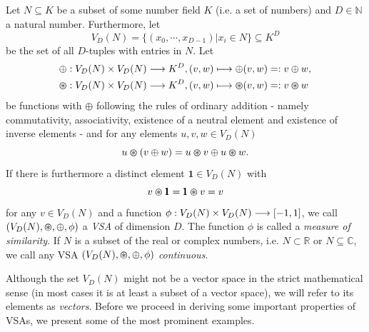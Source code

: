 \begin{defn}
	\label{def:VSA}
	Let $N \subseteq K$ be a subset of some number field $K$ (i.e. a set of numbers) and $D \in \mathbb{N}$ a natural number.
	Furthermore, let
	\[V_{D}(N)=\{\left(x_{0}, \cdots, x_{D-1}\right)  | x_{i} \in N\} \subseteq K^{D}\]
	be the set of all $D$-tuples with entries in $N$.
	Let
	\begin{align*}
		&\oplus: V_{D}(N) \times V_{D}(N) \longrightarrow K^{D}, (v,w) \longmapsto \oplus(v,w) =: v\oplus w, \\
		&\varoast: V_{D}(N) \times V_{D}(N) \longrightarrow K^{D}, (v,w) \longmapsto \varoast(v,w) =: v\varoast w
	\end{align*}
	be functions with $\oplus$ following the rules of ordinary addition - namely commutativity, associativity, existence of a neutral element and existence of inverse elements - and for any elements $u,v,w \in V_{D}(N)$
	\[u \varoast (v \oplus w) = u \varoast v \oplus u \varoast w.\]
	If there is furthermore a distinct element $\pmb{1} \in V_{D}(N)$ with
	\[v \varoast \pmb{1} = \pmb{1} \varoast v = v\]
	for any $v \in V_{D}(N)$ and a function $\phi: V_{D}(N) \times V_{D}(N) \longrightarrow \left[-1,1\right]$, we call $(V_{D}(N), \varoast, \oplus, \phi)$ a \emph{\acrfull{VSA}} of dimension $D$.
	The function $\phi$ is called a \emph{measure of similarity}.
	If $N$ is a subset of the real or complex numbers, i.e. $N \subset \mathbb{R}$ or $N \subseteq \mathbb{C}$, we call any \ac{VSA} $\left(V_{D}(N), \varoast, \oplus, \phi\right)$ \emph{continuous}.
\end{defn}
Although the set $V_{D}(N)$ might not be a vector space in the strict mathematical sense (in most cases it is at least a subset of a vector space), we will refer to its elements as \emph{vectors}.
Before we proceed in deriving some important properties of \acp{VSA}, we present some of the most prominent examples.

